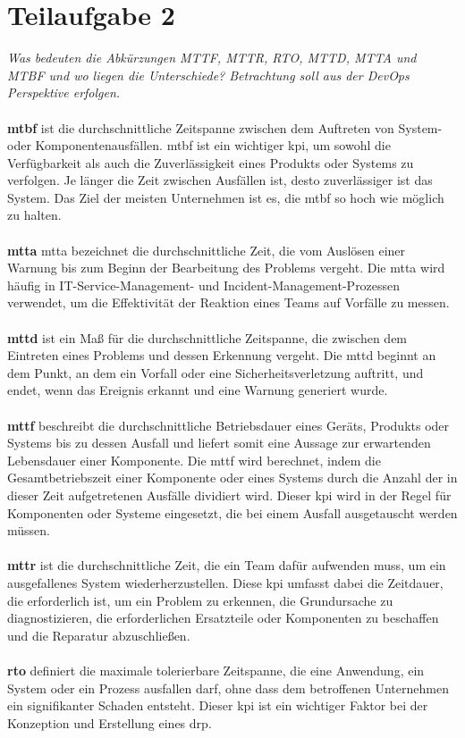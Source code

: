 \chapter{Teilaufgabe 2}

\textit{Was bedeuten die Abkürzungen MTTF, MTTR, RTO, MTTD, MTTA und MTBF und wo liegen die Unterschiede? Betrachtung soll aus der DevOps Perspektive erfolgen.}
\\
\\
\textbf{\ac{mtbf}} ist die durchschnittliche Zeitspanne zwischen dem Auftreten von System- oder Komponentenausfällen. \ac{mtbf} ist ein wichtiger \ac{kpi}, um sowohl die Verfügbarkeit als auch die Zuverlässigkeit eines Produkts oder Systems zu verfolgen. Je länger die Zeit zwischen Ausfällen ist, desto zuverlässiger ist das System. Das Ziel der meisten Unternehmen ist es, die \ac{mtbf} so hoch wie möglich zu halten. \cite{ref04}
\\
\\
\textbf{\ac{mtta}} \ac{mtta} bezeichnet die durchschnittliche Zeit, die vom Auslösen einer Warnung bis zum Beginn der Bearbeitung des Problems vergeht. Die \ac{mtta}  wird häufig in IT-Service-Management- und Incident-Management-Prozessen verwendet, um die Effektivität der Reaktion eines Teams auf Vorfälle zu messen. \cite{ref05}
\\
\\
\textbf{\ac{mttd}} ist ein Maß für die durchschnittliche Zeitspanne, die zwischen dem Eintreten eines Problems und dessen Erkennung vergeht. Die \ac{mttd} beginnt an dem Punkt, an dem ein Vorfall oder eine Sicherheitsverletzung auftritt, und endet, wenn das Ereignis erkannt und eine Warnung generiert wurde. \cite{ref04}
\\
\\
\textbf{\ac{mttf}} beschreibt die durchschnittliche Betriebsdauer eines Geräts, Produkts oder Systems bis zu dessen Ausfall und liefert somit eine Aussage zur erwartenden Lebensdauer einer Komponente. Die \ac{mttf} wird berechnet, indem die Gesamtbetriebszeit einer Komponente oder eines Systems durch die Anzahl der in dieser Zeit aufgetretenen Ausfälle dividiert wird. Dieser \ac{kpi} wird in der Regel für Komponenten oder Systeme eingesetzt, die bei einem Ausfall  ausgetauscht werden müssen. \cite{ref04}
\\
\\
\textbf{\ac{mttr}} ist die durchschnittliche Zeit, die ein Team dafür aufwenden muss, um ein ausgefallenes System wiederherzustellen. Diese \ac{kpi} umfasst dabei die Zeitdauer, die erforderlich ist, um ein Problem zu erkennen, die Grundursache zu diagnostizieren, die erforderlichen Ersatzteile oder Komponenten zu beschaffen und die Reparatur abzuschließen. \cite{ref06}
\\
\\
\textbf{\ac{rto}} definiert die maximale tolerierbare Zeitspanne, die eine Anwendung, ein System oder ein Prozess ausfallen darf, ohne dass dem betroffenen Unternehmen ein signifikanter Schaden entsteht. Dieser \ac{kpi} ist ein wichtiger Faktor bei der Konzeption und Erstellung eines \ac{drp}. \cite{ref07}
